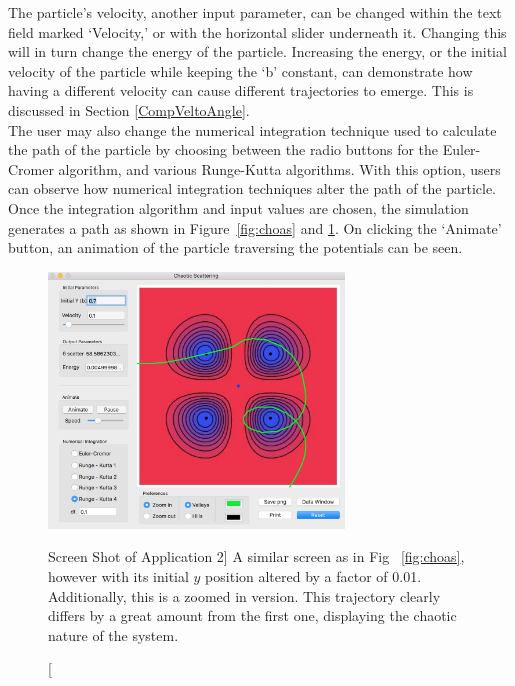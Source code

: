 \documentclass[12pt]{article} %
\begin{document}
The particle's velocity, another input parameter, can be changed within the text field marked `Velocity,' or with the horizontal slider underneath it. Changing this will in turn change the energy of the particle. Increasing the energy, or the initial velocity of the particle while keeping the `b' constant, can demonstrate how having a different velocity can cause different trajectories to emerge. This is discussed in Section \ref{CompVeltoAngle}.\\ 

The user may also change the numerical integration technique used to calculate the path of the particle by choosing between the radio buttons for the Euler-Cromer algorithm, and various Runge-Kutta algorithms. With this option, users can observe how numerical integration techniques alter the path of the particle.\\
 
Once the integration algorithm and input values are chosen, the simulation generates a path as shown in Figure~\ref{fig:choas} and \ref{fig:chaos2}. On clicking the `Animate' button, an animation of the particle traversing the potentials can be seen. \\

\begin{figure}[h]
	\centering
	\includegraphics[width=0.7\textwidth]{image2.png}
	\caption
	[Screen Shot of Application 2]
	{A similar screen as in Fig~ \ref{fig:choas}, however with its initial $y$ position altered by a factor of 0.01. Additionally, this is a zoomed in version. This trajectory clearly differs by a great amount from the first one, displaying the chaotic nature of the system. }
	\label{fig:chaos2}
\end{figure}
\end{document}
